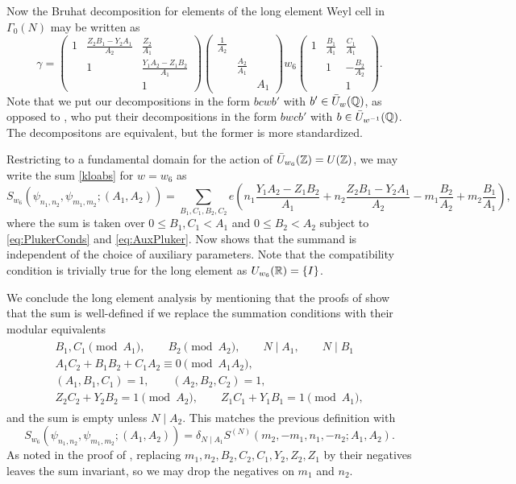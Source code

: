 \documentclass[11pt]{amsart}
\theoremstyle{plain}
\numberwithin{equation}{section}
\theoremstyle{definition}
\begin{document}
Now the Bruhat decomposition for elements of the long element Weyl cell in $\Gamma_0(N)$ may be written as
\[ \gamma = \left(\begin{matrix}1&\frac{Z_2 B_1 - Y_2 A_1}{A_2}&\frac{Z_2}{A_1} \\&1&\frac{Y_1 A_2-Z_1 B_2}{A_1}\\&&1\end{matrix}\right) \left(\begin{matrix}\frac{1}{A_2}\\&\frac{A_2}{A_1}\\&&A_1\end{matrix}\right) w_6 \left(\begin{matrix}1&\frac{B_1}{A_1}&\frac{C_1}{A_1} \\&1&-\frac{B_2}{A_2}\\&&1\end{matrix}\right). \]
Note that we put our decompositions in the form $bcwb'$ with $b' \in \bar{U}_w(\Bbb{Q})$, as opposed to \cite{BFG}, who put their decompositions in the form $bwcb'$ with $b \in \bar{U}_{w^{-1}}(\Bbb{Q})$.
The decompositons are equivalent, but the former is more standardized.

Restricting to a fundamental domain for the action of $\bar{U}_{w_6}(\Bbb{Z}) = U(\Bbb{Z})$, we may write the sum \eqref{kloabs} for $w=w_6$ as 
\[ S_{w_6}(\psi_{n_1,n_2},\psi_{m_1,m_2};(A_1,A_2)) = \sum_{B_1,C_1,B_2,C_2} e\left(n_1 \frac{Y_1 A_2-Z_1 B_2}{A_1}+n_2 \frac{Z_2 B_1 - Y_2 A_1}{A_2}-m_1 \frac{B_2}{A_2}+m_2 \frac{B_1}{A_1}\right), \]
where the sum is taken over $0 \le B_1, C_1 < A_1$ and $0 \le B_2 < A_2$ subject to \eqref{eq:PlukerConds} and \eqref{eq:AuxPluker}.
Now \cite[Lemma 4.1]{BFG} shows that the summand is independent of the choice of auxiliary parameters.
Note that the compatibility condition is trivially true for the long element as $U_{w_6}(\Bbb{R}) = \{I\}$.

We conclude the long element analysis by mentioning that the proofs of \cite[Lemmas 4.1, 4.2]{BFG} show that the sum is well-defined if we replace the summation conditions with their modular equivalents
\begin{align}
\label{eq:LongElementConds}
\begin{array}{l}
	B_1, C_1 \pmod{A_1}, \qquad B_2 \pmod{A_2}, \qquad N\mid A_1, \qquad N \mid  B_1\\
	A_1 C_2+B_1B_2+C_1 A_2\equiv0 \pmod{A_1 A_2}, \\
	(A_1,B_1,C_1)=1, \qquad (A_2,B_2,C_2)=1, \\
	Z_2 C_2+Y_2 B_2=1\pmod{A_2}, \qquad Z_1 C_1+Y_1 B_1=1 \pmod{A_1},
\end{array}
\end{align}
and the sum is empty unless $N\mid A_2$.
This matches the previous definition with
\begin{equation}\label{klo6conv}
S_{w_6}(\psi_{n_1,n_2},\psi_{m_1,m_2};(A_1,A_2)) = \delta_{N\mid A_1} S^{(N)}(m_2,-m_1,n_1,-n_2;A_1, A_2).
\end{equation}
As noted in the proof of \cite[Theorem 5.1]{BFG}, replacing $m_1,n_2,B_2,C_2,C_1,Y_2,Z_2,Z_1$ by their negatives leaves the sum invariant, so we may drop the negatives on $m_1$ and $n_2$.
\end{document}
